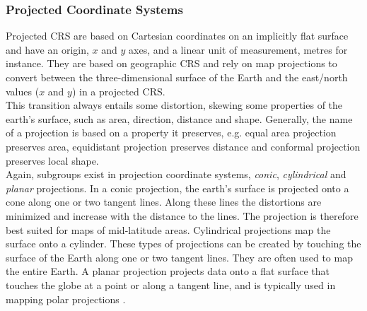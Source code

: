 \subsubsection*{Projected Coordinate Systems}
Projected CRS are based on Cartesian coordinates on an implicitly flat surface and have an origin, $x$ and $y$ axes, and a linear unit of measurement, metres for instance. They are based on geographic CRS and rely on map projections to convert between the three-dimensional surface of the Earth and the east/north values ($x$ and $y$) in a projected CRS.\\
This transition always entails some distortion, skewing some properties of the earth's surface, such as area, direction, distance and shape. Generally, the name of a projection is based on a property it preserves, e.g. equal area projection preserves area, equidistant projection preserves distance and conformal projection preserves local shape. \\
Again, subgroups exist in projection coordinate systems, \textit{conic}, \textit{cylindrical} and \textit{planar} projections. In a conic projection, the earth's surface is projected onto a cone along one or two tangent lines. Along these lines the distortions are minimized and increase with the distance to the lines. The projection is therefore best suited for maps of mid-latitude areas. Cylindrical projections map the surface onto a cylinder. These types of projections can be created by touching the surface of the Earth along one or two tangent lines. They are often used to map the entire Earth. A planar projection projects data onto a flat surface that touches the globe at a point or along a tangent line, and is typically used in mapping polar projections \autocite[][]{lovelace2019geocomputation}.
\clearpage
